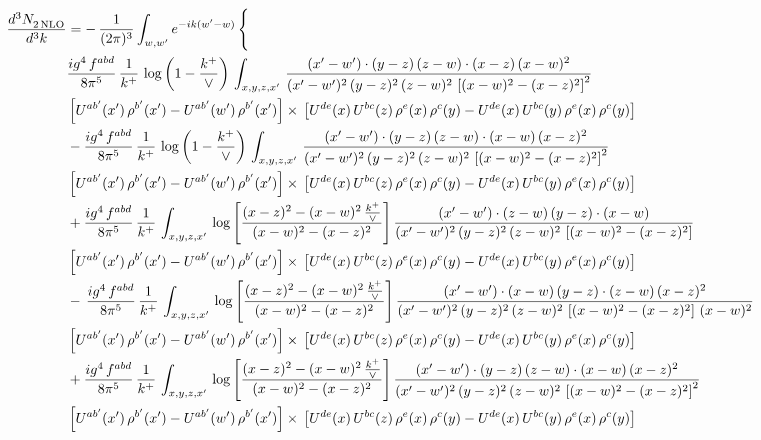\documentclass[9pt]{article}
\numberwithin{equation}{section}
\begin{document}
\begin{align}
   \frac{d^{3}N_{2\,\rm NLO}^{\rm}}{d^{3}k}  & =  -\,\frac{1}{(2\pi)^{3}}  \int_{w, w^\prime} e^{-ik(w^\prime-w)}\, \Bigg\{\notag \\ &  \frac{ig^{4}\, f^{abd}}{8\pi^{5}}\, \frac{1}{k^{+}}\,\log{\left(1-\frac{k^{+}}{\vee}\right)}\, \int_{x,y,z,x'}\,\frac{(x'-w')\cdot  (y-z)\, (z-w)\cdot (x-z)\, (x-w)^{2}}{(x'-w')^{2}\, (y-z)^{2}\, (z-w)^{2}\,\left[(x-w)^{2}-(x-z)^{2}\right]^{2}}\, \notag \\ & \left[U^{ab'}(x')\,\rho^{b'}(x')-U^{ab'}(w')\, \rho^{b'}(x')\right]\times\,\left[U^{de}(x)\,U^{bc}(z)\, \rho^{e}(x)\,\rho^{c}(y)-U^{de}(x)\,U^{bc}(y)\,\rho^{e}(x)\,\rho^{c}(y)\right] \notag \\ &   - \frac{ig^{4}\, f^{abd}}{8\pi^{5}}\, \frac{1}{k^{+}}\,\log{\left(1-\frac{k^{+}}{\vee}\right)}\, \int_{x,y,z,x'}\,\frac{(x'-w')\cdot  (y-z)\, (z-w)\cdot (x-w)\, (x-z)^{2}}{(x'-w')^{2}\, (y-z)^{2}\, (z-w)^{2}\,\left[(x-w)^{2}-(x-z)^{2}\right]^{2}}\, \notag \\ & \left[U^{ab'}(x')\,\rho^{b'}(x')-U^{ab'}(w')\, \rho^{b'}(x')\right]\times\,\left[U^{de}(x)\,U^{bc}(z)\, \rho^{e}(x)\,\rho^{c}(y)-U^{de}(x)\,U^{bc}(y)\,\rho^{e}(x)\,\rho^{c}(y)\right] \notag \\
&  + \frac{ig^{4}\, f^{abd}}{8\pi^{5}}\, \frac{1}{k^{+}}\, \int_{x,y,z,x'}\,\log{\left[\frac{(x-z)^{2}-(x-w)^{2}\,\frac{k^{+}}{\vee}}{(x-w)^{2}-(x-z)^{2}}\right]}\,\frac{(x'-w')\cdot (z-w)\, (y-z)\cdot (x-w)}{(x'-w')^{2}\, (y-z)^{2}\, (z-w)^{2}\,\left[(x-w)^{2}-(x-z)^{2}\right]}\, \notag \\ & \left[U^{ab'}(x')\,\rho^{b'}(x')-U^{ab'}(w')\, \rho^{b'}(x')\right]\times\,\left[U^{de}(x)\,U^{bc}(z)\, \rho^{e}(x)\,\rho^{c}(y)-U^{de}(x)\,U^{bc}(y)\,\rho^{e}(x)\,\rho^{c}(y)\right] \notag \\
& -\,\frac{ig^{4}\, f^{abd}}{8\pi^{5}}\, \frac{1}{k^{+}}\, \int_{x,y,z,x'}\,\log{\left[\frac{(x-z)^{2}-(x-w)^{2}\,\frac{k^{+}}{\vee}}{(x-w)^{2}-(x-z)^{2}}\right]}\,\frac{(x'-w')\cdot (x-w)\, (y-z)\cdot(z-w)\,(x-z)^{2}}{(x'-w')^{2}\, (y-z)^{2}\, (z-w)^{2}\,\left[(x-w)^{2}-(x-z)^{2}\right]\,(x-w)^{2}}\, \notag \\ & \left[U^{ab'}(x')\,\rho^{b'}(x')-U^{ab'}(w')\, \rho^{b'}(x')\right]\times\,\left[U^{de}(x)\,U^{bc}(z)\, \rho^{e}(x)\,\rho^{c}(y)-U^{de}(x)\,U^{bc}(y)\,\rho^{e}(x)\,\rho^{c}(y)\right] \notag \\
& +\frac{ig^{4}\, f^{abd}}{8\pi^{5}}\, \frac{1}{k^{+}}\, \int_{x,y,z,x'}\,\log{\left[\frac{(x-z)^{2}-(x-w)^{2}\,\frac{k^{+}}{\vee}}{(x-w)^{2}-(x-z)^{2}}\right]}\,\frac{(x'-w')\cdot  (y-z)\, (z-w)\cdot (x-w)\, (x-z)^{2}}{(x'-w')^{2}\, (y-z)^{2}\, (z-w)^{2}\,\left[(x-w)^{2}-(x-z)^{2}\right]^{2}}\, \notag \\ & \left[U^{ab'}(x')\,\rho^{b'}(x')-U^{ab'}(w')\, \rho^{b'}(x')\right]\times\,\left[U^{de}(x)\,U^{bc}(z)\, \rho^{e}(x)\,\rho^{c}(y)-U^{de}(x)\,U^{bc}(y)\,\rho^{e}(x)\,\rho^{c}(y)\right] \notag \\

\end{align}
\end{document}
